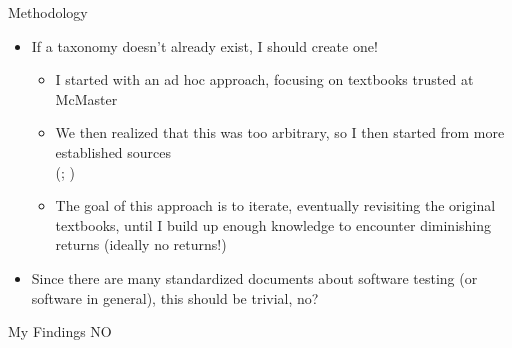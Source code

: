 \documentclass[22pt]{beamer}
\begin{document}
\begin{frame}[fragile]
\begin{textblock}{7.25}
        \begin{block}{\fontsize{37}{20}\selectfont Methodology}
            \begin{itemize}
                \item If a taxonomy doesn't already exist, I should create one!
                      \begin{itemize}
                          \item I started with an ad hoc approach, focusing on
                                textbooks trusted at McMaster \\\citep{Patton2006,
                                    PetersAndPedrycz2000, vanVliet2000}
                          \item We then realized that this was too arbitrary, so
                                I then started from more established sources \\
                                (\citealp{IEEE2022, SWEBOK2024, SWEBOK2014,
                                    IEEE2017, ISO_IEC2023a}; )
                          \item The goal of this approach is to iterate,
                                eventually revisiting the original textbooks,
                                until I build up enough knowledge to encounter
                                diminishing returns (ideally no returns!)
                      \end{itemize}
                \item Since there are many standardized documents about software
                      testing (or software in general), this should be trivial, no?
            \end{itemize}
            \vspace{5mm}
        \end{block}

        \begin{block}{\fontsize{37}{20}\selectfont My Findings}
            \vspace{5mm}
            {\fontsize{185}{20}\selectfont NO}
            \vspace{5mm}
        \end{block}
    \end{textblock}


\end{frame}
\end{document}
